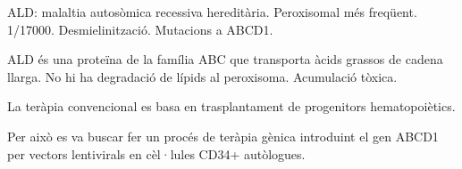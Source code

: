 ALD: malaltia autosòmica recessiva hereditària. Peroxisomal més freqüent. 1/17000. Desmielinització. Mutacions a ABCD1.

ALD és una proteïna de la família ABC que transporta àcids grassos de cadena llarga. No hi ha degradació de lípids al peroxisoma. Acumulació tòxica.

La teràpia convencional es basa en trasplantament de progenitors hematopoiètics.

Per això es va buscar fer un procés de teràpia gènica introduint el gen ABCD1 per vectors lentivirals en cèl·lules CD34+ autòlogues.